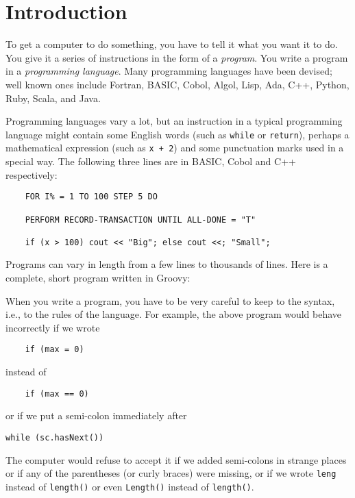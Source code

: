 \section{Introduction}


To get a computer to do something, you have to tell it what you want it
to do.  You give it a series of instructions in the form of a \emph{program}.
You write a program in a \emph{programming language}.
Many programming languages have been devised; well known ones include
Fortran, BASIC, Cobol, Algol, Lisp, Ada, C++, Python, Ruby, Scala, and Java.

Programming languages vary a lot, but
an instruction in a typical programming language might contain
some English words (such as \verb!while! or \verb!return!), perhaps a mathematical
expression (such as \verb!x + 2!) and some punctuation marks used in a special way.
The following three lines are in BASIC, Cobol and C++ respectively:
\begin{Verbatim}
	FOR I% = 1 TO 100 STEP 5 DO

	PERFORM RECORD-TRANSACTION UNTIL ALL-DONE = "T"

	if (x > 100) cout << "Big"; else cout <<; "Small";
\end{Verbatim}

Programs can vary in length from a few lines to thousands of lines.
Here is a complete, short program written in Groovy:


When you write a program, you have to be very careful to keep to the
syntax, i.e., to the rules of the language.  For example, the above program would
behave incorrectly if we wrote 
\begin{Verbatim}
	if (max = 0)
\end{Verbatim}
instead of 
\begin{Verbatim}
	if (max == 0)
\end{Verbatim}
or if we put a semi-colon immediately after 
\begin{Verbatim}
while (sc.hasNext())
\end{Verbatim}
The computer would refuse to accept it if we added semi-colons in strange places
or if any of the parentheses (or curly braces) were missing, or if we wrote
\verb!leng! instead of \verb!length()! or even \verb!Length()! instead of \verb!length()!.

